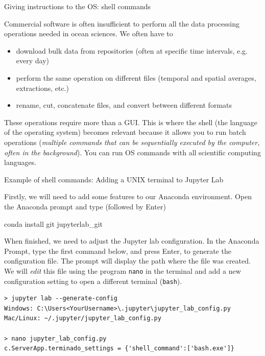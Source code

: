 \documentclass[english,aspectratio=169]{beamer}
\newenvironment{lyxcode}
  {\begin{list}{}{
     \setlength{\rightmargin}{\leftmargin}
     \setlength{\listparindent}{0pt}
     \setlength{\itemsep}{0pt}
     \setlength{\parsep}{0pt}
     \raggedright\normalfont\ttfamily
   }\item[]}
  {\end{list}}
\begin{document}
\begin{frame}{Giving instructions to the OS: shell commands}

Commercial software is often insufficient to perform all the data processing operations needed in ocean sciences. We often have to 
\begin{itemize}
\item download bulk data from repositories (often at specific time intervals, e.g. every day)
\item perform the same operation on different files (temporal and spatial averages, extractions, etc.)
\item rename, cut, concatenate files, and convert between different formats
\end{itemize}
These operations require more than a GUI. This is where the shell (the language of the operating system) becomes relevant because it allows you to run batch operations (\emph{multiple commands that can be sequentially executed by the computer, often in the background}). You can run OS commands with all scientific computing languages.
\end{frame}


\begin{frame}[fragile]{Example of shell commands: Adding a UNIX terminal to Jupyter Lab}

Firstly, we will need to add some features to our Anaconda environment. Open the Anaconda prompt and type (followed by Enter) 
\begin{lyxcode}
    conda install git jupyterlab\_git
\end{lyxcode}

When finished, we need to adjust the Jupyter lab configuration. In the Anaconda Prompt, type the first command below, and press Enter, to generate the configuration file. The prompt will display the path where the file was created. We will \textit{edit} this file using the program \texttt{nano} in the terminal and add a new configuration setting to open a different terminal (\texttt{bash}).
\begin{lstlisting}[basicstyle=\scriptsize\ttfamily]
> jupyter lab --generate-config
Windows: C:\Users<YourUsername>\.jupyter\jupyter_lab_config.py
Mac/Linux: ~/.jupyter/jupyter_lab_config.py 

> nano jupyter_lab_config.py
c.ServerApp.terminado_settings = {'shell_command':['bash.exe']}
\end{lstlisting}

\end{frame}
\end{document}
